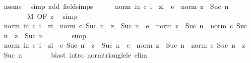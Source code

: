 \begin{isabellebody}
\ assms\ \isamarkupfalse%
\ {\isacharparenleft}{\kern0pt}simp\ add{\isacharcolon}{\kern0pt}\ field{\isacharunderscore}{\kern0pt}simps{\isacharparenright}{\kern0pt}\isanewline
\ \ \ \ \isamarkupfalse%
\ {\isachardoublequoteopen}norm\ {\isacharparenleft}{\kern0pt}{\isasymSum}i{\isasymle}n{\isachardot}{\kern0pt}\ c\ i\ {\isacharasterisk}{\kern0pt}\ z{\isacharcircum}{\kern0pt}i{\isacharparenright}{\kern0pt}\ {\isasymle}\ e\ {\isacharasterisk}{\kern0pt}\ norm\ z\ {\isacharcircum}{\kern0pt}\ Suc\ n{\isachardoublequoteclose}\isanewline
\ \ \ \ \ \ \isamarkupfalse%
\ M\ {\isacharbrackleft}{\kern0pt}OF\ z{}{\isacharbrackright}{\kern0pt}\ \isamarkupfalse%
\ simp\isanewline
\ \ \ \ \isamarkupfalse%
\ \isamarkupfalse%
\ {\isachardoublequoteopen}norm\ {\isacharparenleft}{\kern0pt}{\isasymSum}i{\isasymle}n{\isachardot}{\kern0pt}\ c\ i\ {\isacharasterisk}{\kern0pt}\ z{\isacharcircum}{\kern0pt}i{\isacharparenright}{\kern0pt}\ {\isacharplus}{\kern0pt}\ norm\ {\isacharparenleft}{\kern0pt}c\ {\isacharparenleft}{\kern0pt}Suc\ n{\isacharparenright}{\kern0pt}\ {\isacharasterisk}{\kern0pt}\ z\ {\isacharcircum}{\kern0pt}\ Suc\ n{\isacharparenright}{\kern0pt}\ {\isasymle}\ e\ {\isacharasterisk}{\kern0pt}\ norm\ z\ {\isacharcircum}{\kern0pt}\ Suc\ n\ {\isacharplus}{\kern0pt}\ norm\ {\isacharparenleft}{\kern0pt}c\ {\isacharparenleft}{\kern0pt}Suc\ n{\isacharparenright}{\kern0pt}\ {\isacharasterisk}{\kern0pt}\ z\ {\isacharcircum}{\kern0pt}\ Suc\ n{\isacharparenright}{\kern0pt}{\isachardoublequoteclose}\isanewline
\ \ \ \ \ \ \isamarkupfalse%
\ simp\isanewline
\ \ \ \ \isamarkupfalse%
\ \isamarkupfalse%
\ {\isachardoublequoteopen}norm\ {\isacharparenleft}{\kern0pt}{\isacharparenleft}{\kern0pt}{\isasymSum}i{\isasymle}n{\isachardot}{\kern0pt}\ c\ i\ {\isacharasterisk}{\kern0pt}\ z{\isacharcircum}{\kern0pt}i{\isacharparenright}{\kern0pt}\ {\isacharplus}{\kern0pt}\ c\ {\isacharparenleft}{\kern0pt}Suc\ n{\isacharparenright}{\kern0pt}\ {\isacharasterisk}{\kern0pt}\ z\ {\isacharcircum}{\kern0pt}\ Suc\ n{\isacharparenright}{\kern0pt}\ {\isasymle}\ e\ {\isacharasterisk}{\kern0pt}\ norm\ z\ {\isacharcircum}{\kern0pt}\ Suc\ n\ {\isacharplus}{\kern0pt}\ norm\ {\isacharparenleft}{\kern0pt}c\ {\isacharparenleft}{\kern0pt}Suc\ n{\isacharparenright}{\kern0pt}\ {\isacharasterisk}{\kern0pt}\ z\ {\isacharcircum}{\kern0pt}\ Suc\ n{\isacharparenright}{\kern0pt}{\isachardoublequoteclose}\isanewline
\ \ \ \ \ \ \isamarkupfalse%
\ {\isacharparenleft}{\kern0pt}blast\ intro{\isacharcolon}{\kern0pt}\ norm{\isacharunderscore}{\kern0pt}triangle{\isacharunderscore}{\kern0pt}le\ elim{\isacharcolon}{\kern0pt}\ {\isacharparenright}{\kern0pt}\isanewline

\end{isabellebody}
